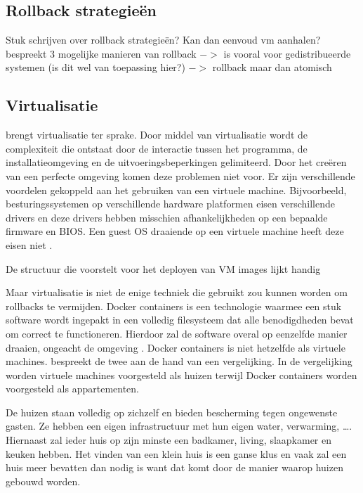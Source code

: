 \subsection{Rollback strategieën}
Stuk schrijven over rollback strategieën? Kan dan eenvoud vm aanhalen?
\citet{srinivasan2004flashback} bespreekt 3 mogelijke manieren van rollback
\citet{elnozahy2002survey} $->$ is vooral voor gedistribueerde systemen (is dit wel van toepassing hier?)
\citet{machado2008enabling} $->$ rollback maar dan atomisch


\subsection{Virtualisatie}\label{sec:virtualisatie}
\citet{softwareDeployment} brengt virtualisatie ter sprake.
Door middel van virtualisatie wordt de complexiteit die ontstaat door de interactie tussen het programma, de installatieomgeving en de uitvoeringsbeperkingen gelimiteerd.
Door het creëren van een perfecte omgeving komen deze problemen niet voor.
Er zijn verschillende voordelen gekoppeld aan het gebruiken van een virtuele machine.
Bijvoorbeeld, besturingssystemen op verschillende hardware platformen eisen verschillende drivers en deze drivers hebben misschien afhankelijkheden op een bepaalde firmware en BIOS.
Een guest OS draaiende op een virtuele machine heeft deze eisen niet \citep{shumate2004implications}.


De structuur die \citet{shumate2004implications} voorstelt voor het deployen van VM images lijkt handig


Maar virtualisatie is niet de enige techniek die gebruikt zou kunnen worden om rollbacks te vermijden.
Docker containers is een technologie waarmee een stuk software wordt ingepakt in een volledig filesysteem dat alle benodigdheden bevat om correct te functioneren.
Hierdoor zal de software overal op eenzelfde manier draaien, ongeacht de omgeving \citep{dockerMain}.
Docker containers is niet hetzelfde als virtuele machines.
\citet{dockerEbook} bespreekt de twee aan de hand van een vergelijking.
In de vergelijking worden virtuele machines voorgesteld als huizen terwijl Docker containers worden voorgesteld als appartementen.

De huizen staan volledig op zichzelf en bieden bescherming tegen ongewenste gasten.
Ze hebben een eigen infrastructuur met hun eigen water, verwarming, \ldots .
Hiernaast zal ieder huis op zijn minste een badkamer, living, slaapkamer en keuken hebben.
Het vinden van een klein huis is een ganse klus en vaak zal een huis meer bevatten dan nodig is want dat komt door de manier waarop huizen gebouwd worden.

